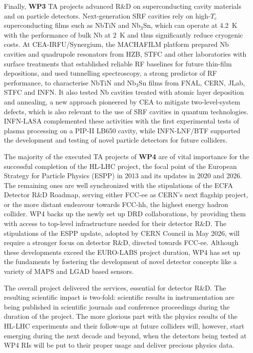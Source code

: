Finally, \textbf{WP3} TA projects advanced R\&D on superconducting cavity materials and on particle detectors. Next-generation SRF cavities rely on high-$T_c$ superconducting films such as NbTiN and Nb$_3$Sn, which can operate at \SI{4.2}{K} with the performance of bulk Nb at \SI{2}{K} and thus significantly reduce cryogenic costs. At CEA-IRFU/Synergium, the MACHAFILM platform prepared Nb cavities and quadrupole resonators from HZB, STFC and other laboratories with surface treatments that established reliable RF baselines for future thin-film depositions, and used tunnelling spectroscopy, a strong predictor of RF performance, to characterise NbTiN and Nb$_3$Sn films from FNAL, CERN, JLab, STFC and INFN. It also tested Nb cavities treated with atomic layer deposition and annealing, a new approach pioneered by CEA to mitigate two-level-system defects, which is also relevant to the use of SRF cavities in quantum technologies. INFN-LASA complemented these activities with the first experimental tests of plasma processing on a PIP-II LB650 cavity, while INFN-LNF/BTF supported the development and testing of novel particle detectors for future colliders.


The majority of the executed TA projects of \textbf{WP4} are of vital importance for the successful completion of the HL-LHC project, the focal point of the European Strategy for Particle Physics (ESPP) in 2013 and its updates in 2020 and 2026. The remaining ones are well synchronized with the stipulations of the ECFA Detector R\&D Roadmap, serving either FCC-ee as CERN's next flagship project, or the more distant endeavour towards FCC-hh, the highest energy hadron collider. WP4 backs up the newly set up DRD collaborations, by providing them with access to top-level infrastructure needed for their detector R\&D. The stipulations of the ESPP update, adopted by CERN Council in May 2026, will require a stronger focus on detector R\&D, directed towards FCC-ee. Although these developments exceed the EURO-LABS project duration, WP4 has set up the fundaments by fostering the development of novel detector concepts like a variety of MAPS and LGAD based sensors.


The overall project delivered the services, essential for detector R\&D. The resulting scientific impact is two-fold: scientific results in instrumentation are being published in scientific journals and conference proceedings during the duration of the project. The more glorious part with the physics results of the HL-LHC experiments and their follow-ups at future colliders will, however, start emerging during the next decade and beyond, when the detectors being tested at WP4 RIs will be put to their proper usage and deliver precious physics data.

